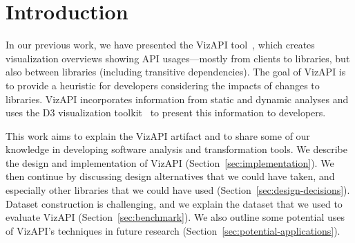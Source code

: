 \section{Introduction}
\label{sec:introduction}

In our previous work, we have presented the VizAPI tool~\cite{venkatanarayanan22:_vizap,venkatanarayanan22:_study_lever_api_usage_patter}, which creates visualization overviews showing API usages---mostly from clients to libraries, but also between libraries (including transitive dependencies). The goal of VizAPI is to provide a heuristic for developers considering the impacts of changes to libraries. VizAPI incorporates information from static and dynamic analyses and uses the D3 visualization toolkit~\cite{bostock2011} to present this information to developers. 

This work aims to explain the VizAPI artifact and to share some of our knowledge in developing software analysis and transformation tools. We describe the design and implementation of VizAPI (Section~\ref{sec:implementation}). We then continue by discussing design alternatives that we could have taken, and especially other libraries that we could have used (Section~\ref{sec:design-decisions}). Dataset construction is challenging, and we explain the dataset that we used to evaluate VizAPI (Section~\ref{sec:benchmark}). We also outline some potential uses of VizAPI's techniques in future research (Section~\ref{sec:potential-applications}).



